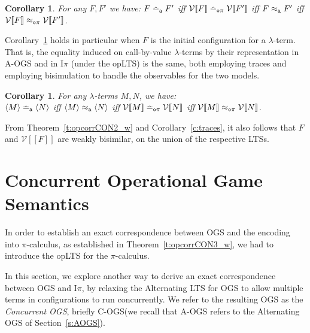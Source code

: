 \documentclass[11pt,a4paper]{amsart}
\theoremstyle{plain}
\theoremstyle{definition}
\theoremstyle{defC}
\theoremstyle{thmC}
\theoremstyle{plain}
\numberwithin{equation}{section}
\newcommand{\AOGS}{\mbox{{\rm A-OGS}}\xspace}      %
\newcommand{\COGS}{\mbox{{\rm C-OGS}}\xspace}      %
\newcommand{\rmm}[1]{{\tt{\lowercase{#1}}}}
\newcommand{\opLTS}{opLTS\xspace}  %
\newcommand{\genTE}[1]{\mathrel{\bumpeq_{\rmm{\lowercase{#1}}}}}       %
\newcommand{\genwb}[1]{\mathrel{\approx_{\rmm{\lowercase{#1}}}}}       %
\newcommand{\wbOPI}{\genwb{o\pi}}       %
\newcommand{\wbA}{\genwb{A}}       %
\newcommand{\TEN}{\genTE{o\pi}}     %
\newcommand{\TEA}{\genTE{A}}       %
\newcommand{\FF}{F}
\newcommand{\cbvSymb}{{\mathcal {V}}}
\newcommand{\encoEnvI}[1]{ \cbvSymb[\! [ #1 ] \! ]  } %
\newcommand{\encoConI}{\encoEnvI} %
\newcommand{\Intp}{\mbox{I$\pi$}\xspace}   %
\newcommand{\piI}{\Intp}   %
\newcommand{\conf}[1]{\langle #1\rangle}
\theoremstyle{plain}
\newtheorem{corollary}[thm]{Corollary}
\theoremstyle{definition}
\begin{document}
\begin{corollary}
\label{c:fa_traces_bis}
For any $\FF,\FF'$ we have:
 $\FF\TEA \FF'$ iff 
$ \encoConI \FF \TEN \encoConI {\FF'}$
iff
 $\FF\wbA \FF'$ iff 
$ \encoConI \FF \wbOPI \encoConI {\FF'}$.
 \end{corollary} 

\noindent
Corollary~\ref{c:fa_traces_bis}  holds in particular when $\FF$ is the initial configuration
for a $\lambda$-term.  That is, 
the equality induced on call-by-value $\lambda$-terms by  
their representation in \AOGS and in \piI 
(under the \opLTS) is the same, both employing traces and employing bisimulation 
to handle   the observables for the two
models. 
\begin{corollary}
\label{c:OGS_opLTSpiI}
For any $\lambda$-terms $M,N$,  we have: 
\\
$\conf{M} \TEA \conf {N}$ iff
$\conf{M} \wbA \conf {N}$ iff
$\encoEnvI {{M} } \TEN\encoEnvI {{N}}$ iff 
$\encoEnvI {{M}} \wbOPI \encoEnvI {{N}}$. 
\end{corollary} 

\noindent
From Theorem~\ref{t:opcorrCON2_w} and Corollary~\ref{c:traces}, it also follows that  $\FF$ and
$\encoConI \FF$ are weakly bisimilar,  on the union of the respective  LTSs.

\section{Concurrent Operational Game Semantics}
\label{s:cogs}

In order to establish an exact correspondence between OGS and the encoding into $\pi$-calculus,
as established in Theorem~\ref{t:opcorrCON3_w}, we had to introduce the \opLTS for the 
$\pi$-calculus.

In this section, we explore another way to derive an exact correspondence between OGS and \piI,
by relaxing the Alternating LTS for OGS to allow multiple terms in 
configurations to run concurrently. 
We refer to the resulting OGS as the \emph{Concurrent OGS}, briefly \COGS (we
recall that  \AOGS refers to the Alternating  OGS of Section~\ref{s:AOGS}).  
\end{document}
